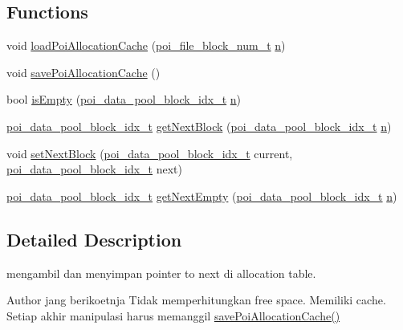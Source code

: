 \subsection*{Functions}
\begin{DoxyCompactItemize}
\item 
void \hyperlink{allocation-block-manager_8h_a2d77f886ffa0a0d025a6a521cc6cf294}{load\-Poi\-Allocation\-Cache} (\hyperlink{file-manager_8h_aef709af8fc6566dcaf55b656bb9f8881}{poi\-\_\-file\-\_\-block\-\_\-num\-\_\-t} \hyperlink{allocation-table-test_8c_a24010dade8ebab3f87a48022772cd975}{n})
\item 
void \hyperlink{allocation-block-manager_8h_aa62c7923af0be489b52b1dcdd7c04e23}{save\-Poi\-Allocation\-Cache} ()
\item 
bool \hyperlink{allocation-block-manager_8h_a4b553c2a61827a60738c9323e6082903}{is\-Empty} (\hyperlink{data-pool-block-manager_8h_a87e19ab8290bcd76be1c7db1e90cc6f6}{poi\-\_\-data\-\_\-pool\-\_\-block\-\_\-idx\-\_\-t} \hyperlink{allocation-table-test_8c_a24010dade8ebab3f87a48022772cd975}{n})
\item 
\hyperlink{data-pool-block-manager_8h_a87e19ab8290bcd76be1c7db1e90cc6f6}{poi\-\_\-data\-\_\-pool\-\_\-block\-\_\-idx\-\_\-t} \hyperlink{allocation-block-manager_8h_a0843a74a7e1cc7c50dbfa521e4ea1cc8}{get\-Next\-Block} (\hyperlink{data-pool-block-manager_8h_a87e19ab8290bcd76be1c7db1e90cc6f6}{poi\-\_\-data\-\_\-pool\-\_\-block\-\_\-idx\-\_\-t} \hyperlink{allocation-table-test_8c_a24010dade8ebab3f87a48022772cd975}{n})
\item 
void \hyperlink{allocation-block-manager_8h_a7387272862663d2af1af9d5c21cddc84}{set\-Next\-Block} (\hyperlink{data-pool-block-manager_8h_a87e19ab8290bcd76be1c7db1e90cc6f6}{poi\-\_\-data\-\_\-pool\-\_\-block\-\_\-idx\-\_\-t} current, \hyperlink{data-pool-block-manager_8h_a87e19ab8290bcd76be1c7db1e90cc6f6}{poi\-\_\-data\-\_\-pool\-\_\-block\-\_\-idx\-\_\-t} next)
\item 
\hyperlink{data-pool-block-manager_8h_a87e19ab8290bcd76be1c7db1e90cc6f6}{poi\-\_\-data\-\_\-pool\-\_\-block\-\_\-idx\-\_\-t} \hyperlink{allocation-block-manager_8h_ab352dc84382d70f0044e92c52165c2cc}{get\-Next\-Empty} (\hyperlink{data-pool-block-manager_8h_a87e19ab8290bcd76be1c7db1e90cc6f6}{poi\-\_\-data\-\_\-pool\-\_\-block\-\_\-idx\-\_\-t} \hyperlink{allocation-table-test_8c_a24010dade8ebab3f87a48022772cd975}{n})
\end{DoxyCompactItemize}


\subsection{Detailed Description}
mengambil dan menyimpan pointer to next di allocation table. \begin{DoxyAuthor}{Author}
jang berikoetnja Tidak memperhitungkan free space. Memiliki cache. Setiap akhir manipulasi harus memanggil \hyperlink{allocation-block-manager_8h_aa62c7923af0be489b52b1dcdd7c04e23}{save\-Poi\-Allocation\-Cache()} 
\end{DoxyAuthor}


